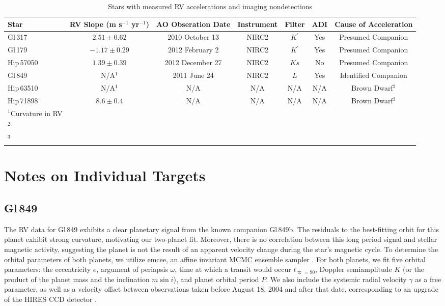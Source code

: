 \begin{landscape}
\begin{table}[hbt!]
\footnotesize
\centering
\begin{tabular}{lcccccc}
\hline
Star & RV Slope (m s$^{-1}$ yr$^{-1}$) & AO Obseration Date & Instrument & Filter & ADI & Cause of Acceleration \\
 \hline
     Gl\,317 & $2.51 \pm 0.62$ & 2010 October 13 & NIRC2  & $K^\prime$ & Yes & Presumed Companion  \\
  Gl\,179 & $-1.17 \pm 0.29$ &  2012 February 2 & NIRC2 &  $K^\prime$ & Yes & Presumed Companion \\ 
  Hip\,57050 & $1.39 \pm 0.39$ & 2012 December 27 & NIRC2 & $Ks$ &  No & Presumed Companion \\
 Gl\,849 & N/A$^1$ & 2011 June 24 &  NIRC2 &  $L$ &  Yes & Identified Companion \\ 
  Hip\,63510 & N/A$^{1}$ & N/A & N/A &  N/A & N/A & Brown Dwarf$^2$  \\ 
  Hip\,71898 & $8.6 \pm 0.4$ &  N/A & N/A &  N/A & N/A & Brown Dwarf$^3$ \\
\hline
 $^1$Curvature in RV & & & & & & \\
 $^2$\citet{Beuzit04} & & & & & & \\
 $^3$\citet{Golimowski04} & & & & & &
\end{tabular}
\caption{Stars with measured RV accelerations and imaging nondetections}
\label{T2}
\end{table}
\end{landscape}
\clearpage

\section{Notes on Individual Targets}
\label{Notes}

\subsection{Gl\,849}
The RV data for Gl\,849 exhibits a clear planetary signal from the known companion Gl\,849b. The residuals to the best-fitting orbit for this planet exhibit strong curvature, motivating our two-planet fit. Moreover, there is no correlation between this long period signal and stellar magnetic activity, suggesting the planet is not the result of an apparent velocity change during the star's magnetic cycle. To determine the orbital parameters of both planets, we utilize emcee, an affine invariant MCMC ensemble sampler \citep{Foreman-Mackey12}. For both planets, we fit five orbital parameters: the eccentricity $e$, argument of periapsis $\omega$, time at which a transit would occur $t_{\varpi=90}$, Doppler semiamplitude $K$ (or the product of the planet mass and the inclination $m \sin i$), and planet orbital period $P$. We also include the systemic radial velocity $\gamma$ as a free parameter, as well as a velocity offset between observations taken before August 18, 2004 and after that date, corresponding to an upgrade of the HIRES CCD detector \citep{Wright11}.

